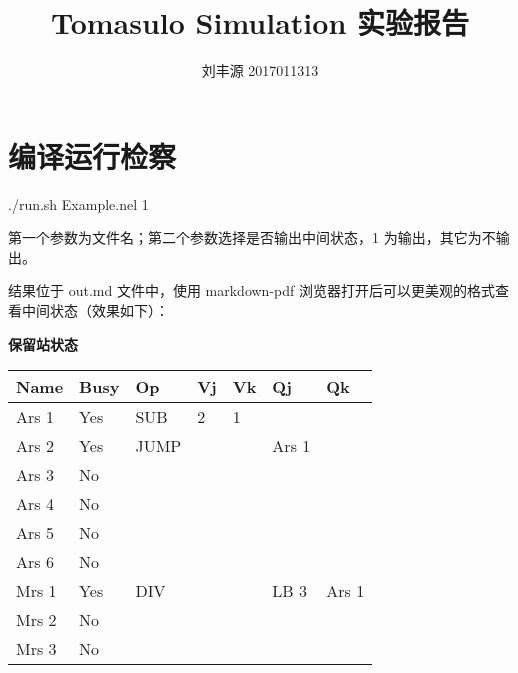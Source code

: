 \documentclass{article}
\title{Tomasulo Simulation 实验报告}
\author{刘丰源 2017011313}
\newlength\tablewidth
\begin{document}
\normalsize
\maketitle
\tableofcontents
\newpage









\section{编译运行检察}




./run.sh Example.nel 1


第一个参数为文件名；第二个参数选择是否输出中间状态，1 为输出，其它为不输出。


结果位于 out.md 文件中，使用 markdown{-}pdf 浏览器打开后可以更美观的格式查看中间状态（效果如下）：


\textbf{保留站状态}


\begin{center}
\setlength\tablewidth{\dimexpr (\textwidth -14\tabcolsep)}
\begin{tabular}{|p{0.163\tablewidth}<{\centering}|p{0.140\tablewidth}<{\centering}|p{0.140\tablewidth}<{\centering}|p{0.116\tablewidth}<{\centering}|p{0.116\tablewidth}<{\centering}|p{0.163\tablewidth}<{\centering}|p{0.163\tablewidth}<{\centering}|}
\hline
\rowcolor{tabletopgray}
\textbf{ Name  }&\textbf{ Busy }&\textbf{ Op   }&\textbf{ Vj  }&\textbf{ Vk  }&\textbf{ Qj    }&\textbf{ Qk    }\\
\hline
 Ars 1 & Yes  & SUB  & 2   & 1   &       &       \\
\hline
 Ars 2 & Yes  & JUMP &     &     & Ars 1 &       \\
\hline
 Ars 3 & No   &      &     &     &       &       \\
\hline
 Ars 4 & No   &      &     &     &       &       \\
\hline
 Ars 5 & No   &      &     &     &       &       \\
\hline
 Ars 6 & No   &      &     &     &       &       \\
\hline
 Mrs 1 & Yes  & DIV  &     &     & LB 3  & Ars 1 \\
\hline
 Mrs 2 & No   &      &     &     &       &       \\
\hline
 Mrs 3 & No   &      &     &     &       &       \\
\hline
\end{tabular}
\end{center}
\end{document}
